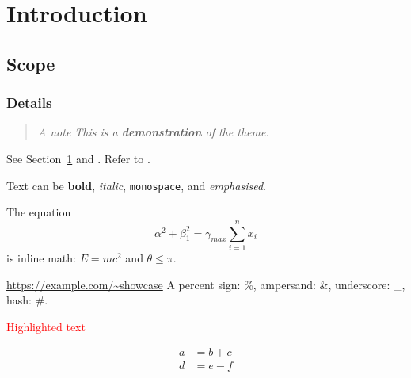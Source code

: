 \documentclass[11pt,a4paper]{article}
\newcommand{\showcase}[1]{\textbf{#1}}
\newenvironment{note}[1]{\begin{quote}\itshape #1}{\end{quote}}
\begin{document}
\section{Introduction}\label{sec:intro}
\subsection{Scope}
\subsubsection{Details}

\begin{note}{A note}
	This is a \showcase{demonstration} of the theme.
\end{note}

See Section~\ref{sec:intro} and \cite{knuth1984texbook}.
Refer to \label{sec:details}.

Text can be \textbf{bold}, \textit{italic}, \texttt{monospace}, and \emph{emphasised}.

The equation
\[
	\alpha^2 + \beta_1^2 = \gamma_{max} \sum_{i=1}^{n} x_i
\]
is inline math: $E = mc^2$ and \(\theta \leq \pi\).

\url{https://example.com/~showcase}
A percent sign: \%, ampersand: \&, underscore: \_, hash: \#.

\textcolor{red}{Highlighted text}

\begin{align}
	a &= b + c \\
	d &= e - f
\end{align}

\end{document}
